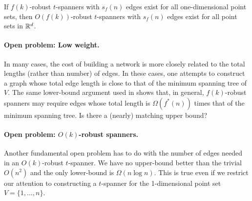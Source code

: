 \documentclass{cccg12}
\begin{document}
\begin{conj}
If $f(k)$-robust $t$-spanners with $s_f(n)$ edges exist for all one-dimensional point sets, then $O(f(k))$-robust $t$-spanners with $s_f(n)$ edges exist for all point sets in $\mathbb{R}^d$.
\end{conj}


\paragraph{Open problem: Low weight.}

In many cases, the cost of building a network is more closely related to
the total lengths (rather than number) of edges.  In these cases, one
attempts to construct a graph whose total edge length is close to that
of the minimum spanning tree of $V$.  The same lower-bound argument used
in  shows that, in general, $f(k)$-robust
spanners may require edges whose total length is $\Omega(f^*(n))$ times
that of the minimum spanning tree.  Is there a (nearly) matching upper bound?

\paragraph{Open problem: $O(k)$-robust spanners.}

Another fundamental open problem has to do with the number of edges needed
in an $O(k)$-robust $t$-spanner.  We have no upper-bound better than the
trivial $O(n^2)$ and the only lower-bound is $\Omega(n\log n)$.  This is
true even if we restrict our attention to constructing a $t$-spanner
for the 1-dimensional point set $V=\{1,\ldots,n\}$.

%
%
%
%



\end{document}
